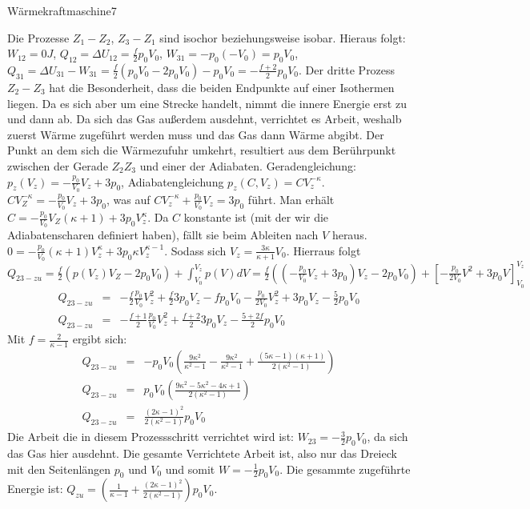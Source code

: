 \begin{problem}{Wärmekraftmaschine}{7}
\begin{solution}
Die Prozesse $Z_1 - Z_2$, $Z_3 - Z_1$ sind isochor beziehungsweise isobar. Hieraus folgt: $W_{12}=0J$, $Q_{12}=\Delta U_{12}=\frac f2 p_0V_0$, $W_{31}=-p_0(-V_0)=p_0V_0$, $Q_{31}=\Delta U_{31}-W_{31}=\frac f2 (p_0V_0-2p_0V_0)-p_0V_0=-\frac{f+2}2p_0V_0$. Der dritte Prozess $Z_2-Z_3$ hat die Besonderheit, dass die beiden Endpunkte auf einer Isothermen liegen. Da es sich aber um eine Strecke handelt, nimmt die innere Energie erst zu und dann ab. Da sich das Gas außerdem ausdehnt, verrichtet es Arbeit, weshalb zuerst Wärme zugeführt werden muss und das Gas dann Wärme abgibt. Der Punkt an dem sich die Wärmezufuhr umkehrt, resultiert aus dem Berührpunkt zwischen der Gerade $Z_2Z_3$ und einer der Adiabaten. Geradengleichung: $p_z(V_z)=-\frac{p_0}{V_0}V_z+3p_0$, Adiabatengleichung $p_z(C,V_z)=CV_z^{-\kappa}$. $CV_Z^{-\kappa}=-\frac{p_0}{V_0}V_z+3p_0$, was auf $CV_{z}^{-\kappa}+\frac{p_0}{V_0}V_z=3p_0$ führt. Man erhält $C=-\frac{p_0}{V_0}V_Z(\kappa+1)+3p_0V_z^{\kappa}$. Da $C$ konstante ist (mit der wir die Adiabatenscharen definiert haben), fällt sie beim Ableiten nach $V$ heraus. $0=-\frac{p_0}{V_0}(\kappa+1)V_z^{\kappa}+3p_0\kappa V_z^{\kappa -1}$. Sodass sich $V_z=\frac{3\kappa}{\kappa+1}V_0$. Hierraus folgt $Q_{23-zu}=\frac f2 (p(V_z)V_Z-2p_0V_0)+\int_{V_0}^{V_z}p(V)dV=\frac f2 ((-\frac{p_0}{V_0}V_z+3p_0)V_z-2p_0V_0)+[-\frac{p_0}{2V_0}V^2+3p_0V]_{V_0}^{V_z}$
\begin{eqnarray}
\nonumber Q_{23-zu}&=&-\frac f2\frac{p_0}{V_0}V_z^2+\frac f23p_0V_z-fp_0V_0-\frac{p_0}{2V_0}V_z^2+3p_0V_z-\frac 52p_0V_0\\
\nonumber Q_{23-zu}&=&-\frac{f+1}2\frac{p_0}{V_0}V_z^2+\frac{f+2}23p_0V_z-\frac{5+2f}2p_0V_0
\end{eqnarray}
Mit $f=\frac 2{\kappa-1}$ ergibt sich:
\begin{eqnarray}
\nonumber Q_{23-zu}&=&-p_0V_0\left(\frac{9\kappa^2}{\kappa^2-1}-\frac{9\kappa^2}{\kappa^2-1}+\frac{(5\kappa -1)(\kappa +1)}{2(\kappa^2-1)}\right)\\
\nonumber Q_{23-zu}&=&p_0V_0\left(\frac{9\kappa^2-5\kappa^2-4\kappa+1}{2(\kappa^2-1)}\right)\\
\nonumber Q_{23-zu}&=&\frac{(2\kappa-1)^2}{2(\kappa^2-1)}p_0V_0
\end{eqnarray}
Die Arbeit die in diesem Prozessschritt verrichtet wird ist: $W_{23}=-\frac 32p_0V_0$, da sich das Gas hier ausdehnt. Die gesamte Verrichtete Arbeit ist, also nur das Dreieck mit den Seitenlängen $p_0$ und $V_0$ und somit $W=-\frac 12p_0V_0$. Die gesammte zugeführte Energie ist: $Q_{zu}=(\frac 1{\kappa -1}+\frac{(2\kappa-1)^2}{2(\kappa^2-1)})p_0V_0$.

\end{solution}
\end{problem}
